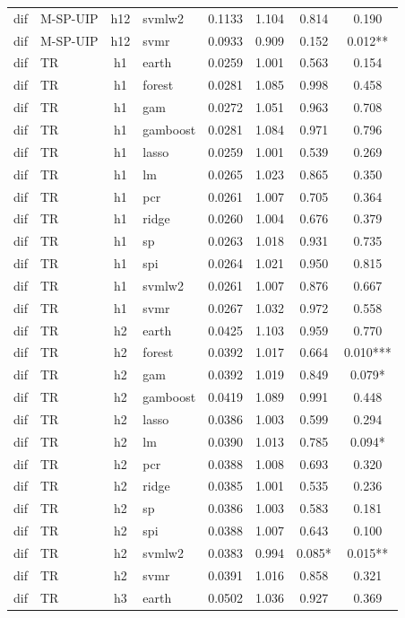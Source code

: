 \begin{ThreePartTable}
\begin{longtable}[t]{llclcccc}
dif & M-SP-UIP & h12 & svmlw2 & 0.1133 & 1.104 & 0.814 & 0.190\\
dif & M-SP-UIP & h12 & svmr & 0.0933 & 0.909 & 0.152 & 0.012**\\
\addlinespace
dif & TR & h1 & earth & 0.0259 & 1.001 & 0.563 & 0.154\\
dif & TR & h1 & forest & 0.0281 & 1.085 & 0.998 & 0.458\\
dif & TR & h1 & gam & 0.0272 & 1.051 & 0.963 & 0.708\\
dif & TR & h1 & gamboost & 0.0281 & 1.084 & 0.971 & 0.796\\
dif & TR & h1 & lasso & 0.0259 & 1.001 & 0.539 & 0.269\\
dif & TR & h1 & lm & 0.0265 & 1.023 & 0.865 & 0.350\\
dif & TR & h1 & pcr & 0.0261 & 1.007 & 0.705 & 0.364\\
dif & TR & h1 & ridge & 0.0260 & 1.004 & 0.676 & 0.379\\
dif & TR & h1 & sp & 0.0263 & 1.018 & 0.931 & 0.735\\
dif & TR & h1 & spi & 0.0264 & 1.021 & 0.950 & 0.815\\
dif & TR & h1 & svmlw2 & 0.0261 & 1.007 & 0.876 & 0.667\\
dif & TR & h1 & svmr & 0.0267 & 1.032 & 0.972 & 0.558\\
\addlinespace
dif & TR & h2 & earth & 0.0425 & 1.103 & 0.959 & 0.770\\
dif & TR & h2 & forest & 0.0392 & 1.017 & 0.664 & 0.010***\\
dif & TR & h2 & gam & 0.0392 & 1.019 & 0.849 & 0.079*\\
dif & TR & h2 & gamboost & 0.0419 & 1.089 & 0.991 & 0.448\\
dif & TR & h2 & lasso & 0.0386 & 1.003 & 0.599 & 0.294\\
dif & TR & h2 & lm & 0.0390 & 1.013 & 0.785 & 0.094*\\
dif & TR & h2 & pcr & 0.0388 & 1.008 & 0.693 & 0.320\\
dif & TR & h2 & ridge & 0.0385 & 1.001 & 0.535 & 0.236\\
dif & TR & h2 & sp & 0.0386 & 1.003 & 0.583 & 0.181\\
dif & TR & h2 & spi & 0.0388 & 1.007 & 0.643 & 0.100\\
dif & TR & h2 & svmlw2 & 0.0383 & 0.994 & 0.085* & 0.015**\\
dif & TR & h2 & svmr & 0.0391 & 1.016 & 0.858 & 0.321\\
\addlinespace
dif & TR & h3 & earth & 0.0502 & 1.036 & 0.927 & 0.369\\

\end{longtable}
\end{ThreePartTable}
